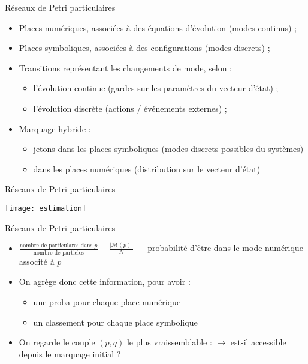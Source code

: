 \documentclass[compress]{beamer}
\begin{document}
\begin{frame}{Réseaux de Petri particulaires}
\begin{itemize}
\item Places numériques, associées à des équations d'évolution (modes continus) ;
\item Places symboliques, associées à des configurations (modes discrets) ;
\item Transitions représentant les changements de mode, selon :
	\begin{itemize}
	\item l'évolution continue (gardes sur les paramètres du vecteur d'état) ;
	\item l'évolution discrète (actions / événements externes) ;
	\end{itemize}
\item Marquage hybride :
	\begin{itemize}
	\item jetons  dans les places symboliques (modes discrets possibles du systèmes)
	\item {} dans les places numériques (distribution sur le vecteur d'état)
	\end{itemize}
\end{itemize}
\end{frame}

\begin{frame}{Réseaux de Petri particulaires}
\begin{center}
\texttt{[image: estimation]}
\end{center}
\end{frame}

\begin{frame}{Réseaux de Petri particulaires}
\begin{itemize}
\item $\frac{\text{nombre de particulares dans }p}{\text{nombre de particles}} = \frac{|\mathcal{M}(p)|}{N} = $
probabilité d'être dans le mode numérique associté à $p$
\item On agrège donc cette information, pour avoir :
	\begin{itemize}
	\item une proba pour chaque place numérique
	\item un classement pour chaque place symbolique
	\end{itemize}
\item On regarde le couple $(p, q)$ le plus vraissemblable :
$\longrightarrow$ est-il accessible depuis le marquage initial ?
\end{itemize}
\end{frame}
\end{document}

